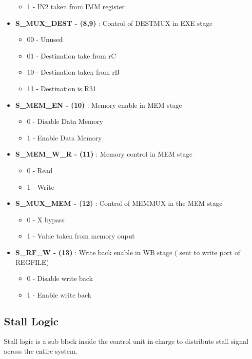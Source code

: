 \documentclass[12pt]{article}
\begin{document}
\begin{itemize}
\begin{itemize}
		\item 1 - IN2 taken from IMM register
	\end{itemize}
	\item \textbf{S\_MUX\_DEST - (8,9)} : Control of DESTMUX in EXE stage
	\begin{itemize}
		\item 00 - Unused 
		\item 01 - Destination take from rC
		\item 10 - Destination taken from rB
		\item 11 - Destination is R31
	\end{itemize}
	\item \textbf{S\_MEM\_EN - (10)} : Memory enable in MEM stage
	\begin{itemize}
		\item 0 - Disable Data Memory 
		\item 1 - Enable Data Memory
	\end{itemize}
		\item \textbf{S\_MEM\_W\_R - (11)} : Memory control in MEM stage
	\begin{itemize}
		\item 0 - Read 
		\item 1 - Write
	\end{itemize}
	\item\textbf{ S\_MUX\_MEM - (12)} : Control of MEMMUX in the MEM stage
	\begin{itemize}
		\item 0 - X bypass
		\item 1 - Value taken from memory ouput
	\end{itemize}
	\item \textbf{S\_RF\_W - (13)} : Write back enable in WB stage ( sent to write port of REGFILE)
	\begin{itemize}
		\item 0 - Disable write back 
		\item 1 - Enable write back
	\end{itemize}
	
\end{itemize}


\subsection{Stall Logic}

Stall logic is a sub block inside the control unit in charge to distribute stall signal across the entire system.
\end{document}
